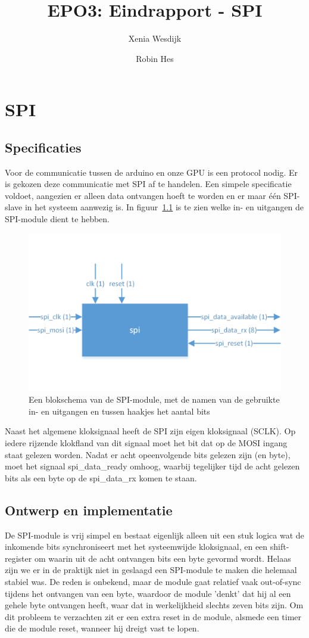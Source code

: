\documentclass{scrartcl} %
\author{Xenia Wesdijk \and Robin Hes}
\title{EPO3: Eindrapport - SPI}
\begin{document}
\chapter{SPI}
\label{ch:spi}

\section{Specificaties}
Voor de communicatie tussen de arduino en onze GPU is een protocol nodig. Er is gekozen deze communicatie met SPI af te handelen. Een simpele specificatie voldoet, aangezien er alleen data ontvangen hoeft te worden en er maar één SPI-slave in het systeem aanwezig is. In figuur~\ref{fig:spi-schema} is te zien welke in- en uitgangen de SPI-module dient te hebben.

\begin{figure}[H]
	\centering
	\includegraphics[width=\textwidth]{resource/spi.png}
	\caption{Een blokschema van de SPI-module, met de namen van de gebruikte in- en uitgangen en tussen haakjes het aantal bits}
	\label{fig:spi-schema}
\end{figure}

Naast het algemene kloksignaal heeft de SPI zijn eigen kloksignaal (SCLK). Op iedere rijzende klokfland van dit signaal moet het bit dat op de MOSI ingang staat gelezen worden. Nadat er acht opeenvolgende bits gelezen zijn (en byte), moet het signaal spi\_data\_ready omhoog, waarbij tegelijker tijd de acht gelezen bits als een byte op de spi\_data\_rx komen te staan.

\section{Ontwerp en implementatie}
De SPI-module is vrij simpel en bestaat eigenlijk alleen uit een stuk logica wat de inkomende bits synchroniseert met het systeemwijde kloksignaal, en een shift-register om waarin uit de acht ontvangen bits een byte gevormd wordt. Helaas zijn we er in de praktijk niet in geslaagd een SPI-module te maken die helemaal stabiel was. De reden is onbekend, maar de module gaat relatief vaak out-of-sync tijdens het ontvangen van een byte, waardoor de module 'denkt' dat hij al een gehele byte ontvangen heeft, waar dat in werkelijkheid slechts zeven bits zijn. Om dit probleem te verzachten zit er een extra reset in de module, alsmede een timer die de module reset, wanneer hij dreigt vast te lopen.
\end{document}
